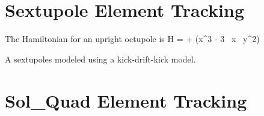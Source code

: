 \section{Sextupole Element Tracking}
\label{s:sextupole.std}

The Hamiltonian for an upright octupole is
\Begineq
  H =  +  (x^3 - 3 \, x \, y^2)
\Endeq

A sextupoles modeled using a kick-drift-kick model.

\section{Sol\_Quad Element Tracking}
\label{s:sol.quad.std}

